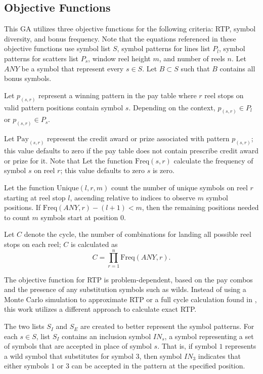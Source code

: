 \documentclass[conference]{IEEEtran}
\begin{document}
\subsection{Objective Functions}
This GA utilizes three objective functions for the following criteria: RTP, symbol diversity, and bonus frequency.
Note that the equations referenced in these objective functions use symbol list $S$, symbol patterns for lines list $P_l$, symbol patterns for scatters list $P_s$, window reel height $m$, and number of reels $n$.
Let $ANY$ be a symbol that represent every $s \in S$.
Let $B \subset S$ such that $B$ contains all bonus symbols.
\par
Let $p_{(s,r)}$ represent a winning pattern in the pay table where $r$ reel stops on valid pattern positions contain symbol $s$. Depending on the context, $p_{(s,r)} \in P_l$ or $p_{(s,r)} \in P_s$.
\par
Let $\text{Pay}_{(s,r)}$ represent the credit award or prize associated with pattern $p_{(s,r)}$; this value defaults to zero if the pay table does not contain prescribe credit award or prize for it. 
Note that 
Let the function $\text{Freq}(s,r)$ calculate the frequency of symbol $s$ on reel $r$; this value defaults to zero $s$ is zero.
\par
Let the function $\text{Unique}(l,r,m)$ count the number of unique symbols on reel $r$ starting at reel stop $l$, ascending relative to indices to observe $m$ symbol positions.
If $\text{Freq}(ANY,r) - (l + 1) < m$, then the remaining positions needed to count $m$ symbols start at position $0$.
\par
Let $C$ denote the cycle, the number of combinations for landing all possible reel stops on each reel; $C$ is calculated as 
\begin{equation}
C = \prod_{r=1}^{n} \text{Freq}(ANY,r).
\end{equation}
\par
The objective function for RTP is problem-dependent, based on the pay combos and the presence of any substitution symbols such as wilds.
Instead of using a Monte Carlo simulation to approximate RTP or a full cycle calculation found in \cite{keremedchiev2017slot}, this work utilizes a different approach to calculate exact RTP.
\par
The two lists $S_I$ and $S_E$ are created to better represent the symbol patterns.
For each $s \in S$, list $S_I$ contains an inclusion symbol $IN_s$, a symbol representing a set of symbols that are accepted in place of symbol $s$.
That is, if symbol $1$ represents a wild symbol that substitutes for symbol $3$, then symbol $IN_3$ indicates that either symbols $1$ or $3$ can be accepted in the pattern at the specified position.
\end{document}
